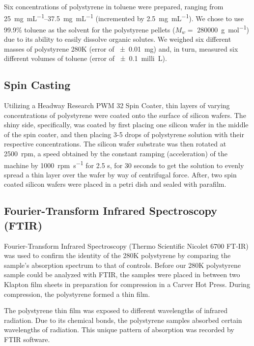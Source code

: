 \documentclass[twocolumn]{article}
\begin{document}
                Six concentrations of polystyrene in toluene were prepared, ranging from \qtyrange{25}{37.5}{\milli\gram\per\milli\liter} (incremented by \qty{2.5}{\milli\gram\per\milli\liter}). We chose to use 99.9\% toluene as the solvent for the polystyrene pellets ($M_w = $ \qty{280000}{\gram\per\mol}) due to its ability to easily dissolve organic solutes. We weighed six different masses of polystyrene 280K (error of \qty{\pm 0.01}{\milli\gram}) and, in turn, measured six different volumes of toluene (error of \qty{\pm 0.1}{milli\liter}).

            \subsection{Spin Casting}
                Utilizing a Headway Research PWM 32 Spin Coater, thin layers of varying concentrations of polystyrene were coated onto the surface of silicon wafers. The shiny side, specifically, was coated by first placing one silicon wafer in the middle of the spin coater, and then placing 3­-5 drops of polystyrene solution with their respective concentrations. The silicon wafer substrate was then rotated at \qty{2500}{rpm}, a speed obtained by the constant ramping (acceleration) of the machine by \qty{1000}{rpm\per\second} for 2.5 s, for 30 seconds to get the solution to evenly spread a thin layer over the wafer by way of centrifugal force. After, two spin coated silicon wafers were placed in a petri dish and sealed with parafilm. 

            \subsection{Fourier-Transform Infrared Spectroscopy (FTIR)}
                Fourier-Transform Infrared Spectroscopy (Thermo Scientific Nicolet 6700 FT-IR) was used to confirm the identity of the 280K polystyrene by comparing the sample's absorption spectrum to that of controls. Before our 280K polystyrene sample could be analyzed with FTIR, the samples were placed in between two Klapton film sheets in preparation for compression in a Carver Hot Press. During compression, the polystyrene formed a thin film. 

                The polystyrene thin film was exposed to different wavelengths of infrared radiation. Due to its chemical bonds, the polystyrene samples absorbed certain wavelengths of radiation. This unique pattern of absorption was recorded by FTIR software.
\end{document}
